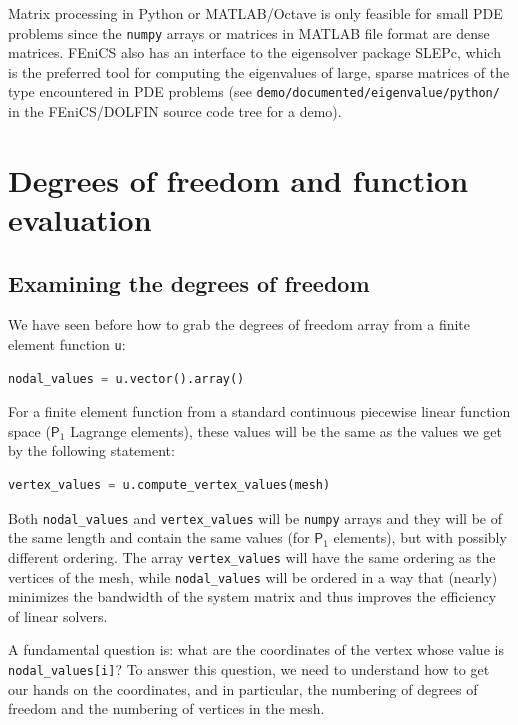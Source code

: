 \documentclass[graybox,envcountchap,sectrefs,final]{svmonodo}
\begin{document}

Matrix processing in Python or MATLAB/Octave is only feasible for
small PDE problems since the \texttt{numpy} arrays or matrices in MATLAB file
format are dense matrices. FEniCS also has an interface to the
eigensolver package SLEPc, which is the preferred tool for computing
the eigenvalues of large, sparse matrices of the type encountered in
PDE problems (see \texttt{demo/documented/eigenvalue/python/} in the
FEniCS/DOLFIN source code tree for a demo).

\section{Degrees of freedom and function evaluation}

\subsection{Examining the degrees of freedom}
\label{ch:poisson0:verify1}


We have seen before how to grab the degrees of freedom array from a
finite element function \texttt{u}:

\begin{lstlisting}[language=Python,style=graycolor]
nodal_values = u.vector().array()
\end{lstlisting}

For a finite element function from a standard continuous piecewise linear
function space ($\mathsf{P}_1$ Lagrange elements), these values will
be the same as the values we get by the following statement:

\begin{lstlisting}[language=Python,style=graycolor]
vertex_values = u.compute_vertex_values(mesh)
\end{lstlisting}
Both \Verb!nodal_values! and \Verb!vertex_values! will be \texttt{numpy} arrays and
they will be of the same length and contain the same values (for
$\mathsf{P}_1$ elements), but with possibly different ordering. The
array \Verb!vertex_values! will have the same ordering as the vertices of
the mesh, while \Verb!nodal_values! will be ordered in a way that (nearly)
minimizes the bandwidth of the system matrix and thus improves the
efficiency of linear solvers.

A fundamental question is: what are the
coordinates of the vertex whose value is \Verb!nodal_values[i]!? To answer this
question, we need to understand how to get our hands on the
coordinates, and in particular, the numbering of degrees of freedom
and the numbering of vertices in the mesh.
\end{document}
